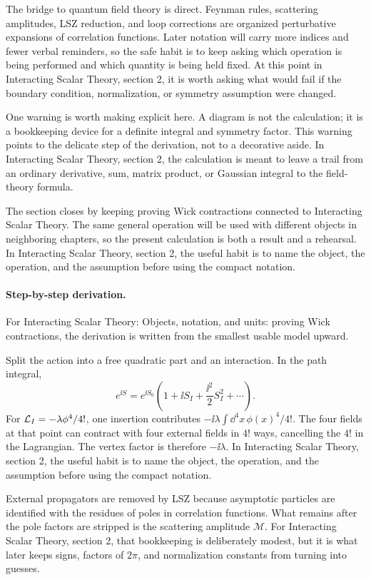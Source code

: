The bridge to quantum field theory is direct.  Feynman rules, scattering amplitudes, LSZ reduction, and loop corrections are organized perturbative expansions of correlation functions.  Later notation will carry more indices and fewer verbal reminders, so the safe habit is to keep asking which operation is being performed and which quantity is being held fixed.  At this point in Interacting Scalar Theory, section 2, it is worth asking what would fail if the boundary condition, normalization, or symmetry assumption were changed.

One warning is worth making explicit here.  A diagram is not the calculation; it is a bookkeeping device for a definite integral and symmetry factor.  This warning points to the delicate step of the derivation, not to a decorative aside.  In Interacting Scalar Theory, section 2, the calculation is meant to leave a trail from an ordinary derivative, sum, matrix product, or Gaussian integral to the field-theory formula.

The section closes by keeping proving Wick contractions connected to Interacting Scalar Theory.  The same general operation will be used with different objects in neighboring chapters, so the present calculation is both a result and a rehearsal.  In Interacting Scalar Theory, section 2, the useful habit is to name the object, the operation, and the assumption before using the compact notation.



\paragraph{Step-by-step derivation.}

For Interacting Scalar Theory: Objects, notation, and units: proving Wick contractions, the derivation is written from the smallest usable model upward.

Split the action into a free quadratic part and an interaction.  In the path integral,
\[
  e^{\ii S}=e^{\ii S_0}\left(1+\ii S_I+\frac{\ii^2}{2}S_I^2+\cdots\right).
\]
For \(\mathcal L_I=-\lambda\phi^4/4!\), one insertion contributes \(-\ii\lambda\int\dd^4x\,\phi(x)^4/4!\).  The four fields at that point can contract with four external fields in \(4!\) ways, cancelling the \(4!\) in the Lagrangian.  The vertex factor is therefore \(-\ii\lambda\).  In Interacting Scalar Theory, section 2, the useful habit is to name the object, the operation, and the assumption before using the compact notation.

External propagators are removed by LSZ because asymptotic particles are identified with the residues of poles in correlation functions.  What remains after the pole factors are stripped is the scattering amplitude \(\mathcal M\).  For Interacting Scalar Theory, section 2, that bookkeeping is deliberately modest, but it is what later keeps signs, factors of \(2\pi\), and normalization constants from turning into guesses.

